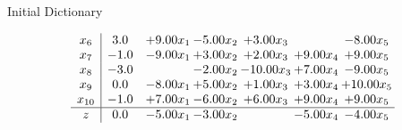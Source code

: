 \documentclass[8pt]{article}
\begin{document}
Initial Dictionary 

\[\begin{array}{c| c c@{\hskip 2pt} c@{\hskip 2pt} c@{\hskip 2pt} c@{\hskip 2pt} c@{\hskip 2pt} }
 x_{6}   &  3.0 & +  9.00 x_{1} & -5.00 x_{2} & +  3.00 x_{3} &   & -8.00 x_{5}\\
 x_{7}   &  -1.0 & -9.00 x_{1} & +  3.00 x_{2} & +  2.00 x_{3} & +  9.00 x_{4} & +  9.00 x_{5}\\
 x_{8}   &  -3.0  &   & -2.00 x_{2} & -10.00 x_{3} & +  7.00 x_{4} & -9.00 x_{5}\\
 x_{9}   &  0.0 & -8.00 x_{1} & +  5.00 x_{2} & +  1.00 x_{3} & +  3.00 x_{4} & + 10.00 x_{5}\\
 x_{10}   &  -1.0 & +  7.00 x_{1} & -6.00 x_{2} & +  6.00 x_{3} & +  9.00 x_{4} & +  9.00 x_{5}\\
\hline
z    &  0.0 & -5.00 x_{1} & -3.00 x_{2} &   & -5.00 x_{4} & -4.00 x_{5}\\
\end{array}\]
\end{document}
